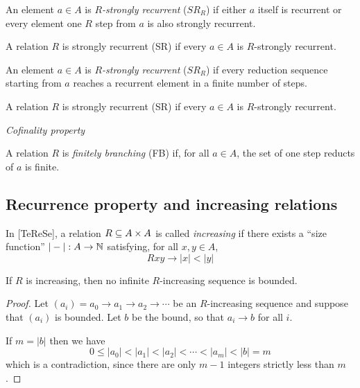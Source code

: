 \documentclass{scrartcl}
\begin{document}
\begin{dfn}
  An element $a \in A$ is \emph{$R$-strongly recurrent} ($SR_R$) if either $a$ itself is recurrent or every element one $R$ step 
  from $a$ is also strongly recurrent.

  A relation $R$ is strongly recurrent (SR) if every
  $a \in A$ is $R$-strongly recurrent.
\end{dfn}

\begin{dfn}
  An element $a \in A$ is \emph{$R$-strongly recurrent} ($SR_R$) if every reduction sequence starting from $a$ reaches a recurrent element in a finite number of steps.

  A relation $R$ is strongly recurrent (SR) if every
  $a \in A$ is $R$-strongly recurrent.
\end{dfn}







\begin{dfn}
  \emph{Cofinality property}
\end{dfn}

\begin{dfn}
  A relation $R$ is \emph{finitely branching} (FB) if, for all $a \in A$, the set of one step reducts of $a$ is finite.
\end{dfn}

\subsection{Recurrence property and increasing relations}

In [TeReSe], a relation $R \subseteq A \times A$ is called \emph{increasing} if there
exists a ``size function'' $|-| : A \to \mathbb{N}$ satisfying, for all $x, y \in A$,
 \[ Rxy \to |x| < |y| \]

\begin{prop}
  If $R$ is increasing, then no infinite $R$-increasing sequence is bounded.
\end{prop}
\begin{proof}
  Let $(a_i) = a_0 \to a_1 \to a_2 \to \cdots$ be an $R$-increasing sequence
  and suppose that $(a_i)$ is bounded.  Let $b$ be the bound, so that $a_i \to b$ for all $i$.

  If $m = |b|$ then we have
  \[ 0 \le |a_0| < |a_1| < |a_2| < \cdots < |a_m| < |b| = m \]
  which is a contradiction, since there are only $m-1$ integers strictly less than $m$.
\end{proof}
\end{document}

